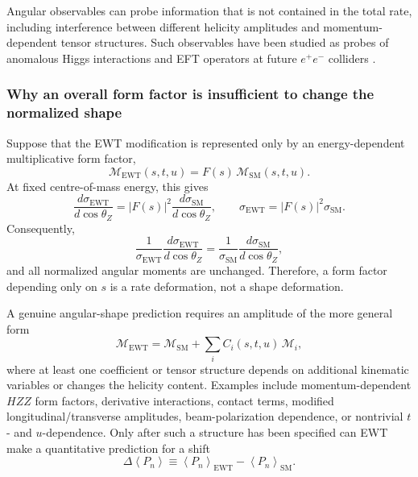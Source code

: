 \documentclass[10pt,a4paper]{article}
\begin{document}
Angular observables can probe information that is not contained in the total rate, including interference between different helicity amplitudes and momentum-dependent tensor structures. Such observables have been studied as probes of anomalous Higgs interactions and EFT operators at future $e^+e^-$ colliders \cite{Craig2016,Liu2016,Ge2016}.

\subsubsection{Why an overall form factor is insufficient to change the normalized shape}
\label{sec:ewt_form_factor_limit}

Suppose that the EWT modification is represented only by an energy-dependent multiplicative form factor,
\begin{equation}
	\mathcal{M}_{\mathrm{EWT}}(s,t,u)
	=F(s)\,\mathcal{M}_{\mathrm{SM}}(s,t,u).
	\label{eq:ewt_overall_form_factor}
\end{equation}
At fixed centre-of-mass energy, this gives
\begin{equation}
	\frac{d\sigma_{\mathrm{EWT}}}{d\cos\theta_Z}
	=|F(s)|^2
	\frac{d\sigma_{\mathrm{SM}}}{d\cos\theta_Z},
	\qquad
	\sigma_{\mathrm{EWT}}=|F(s)|^2\sigma_{\mathrm{SM}}.
	\label{eq:ewt_rate_only_form_factor}
\end{equation}
Consequently,
\begin{equation}
	\frac{1}{\sigma_{\mathrm{EWT}}}
	\frac{d\sigma_{\mathrm{EWT}}}{d\cos\theta_Z}
	=
	\frac{1}{\sigma_{\mathrm{SM}}}
	\frac{d\sigma_{\mathrm{SM}}}{d\cos\theta_Z},
	\label{eq:ewt_shape_invariance}
\end{equation}
and all normalized angular moments are unchanged. Therefore, a form factor depending only on $s$ is a rate deformation, not a shape deformation.

A genuine angular-shape prediction requires an amplitude of the more general form
\begin{equation}
	\mathcal{M}_{\mathrm{EWT}}
	=
	\mathcal{M}_{\mathrm{SM}}
	+\sum_i C_i(s,t,u)\,\mathcal{M}_i,
	\label{eq:ewt_shape_deformation}
\end{equation}
where at least one coefficient or tensor structure depends on additional kinematic variables or changes the helicity content. Examples include momentum-dependent $HZZ$ form factors, derivative interactions, contact terms, modified longitudinal/transverse amplitudes, beam-polarization dependence, or nontrivial $t$- and $u$-dependence. Only after such a structure has been specified can EWT make a quantitative prediction for a shift
\begin{equation}
	\Delta\!\left\langle P_n\right\rangle
	\equiv
	\left\langle P_n\right\rangle_{\mathrm{EWT}}
	-
	\left\langle P_n\right\rangle_{\mathrm{SM}}.
\end{equation}
\end{document}
